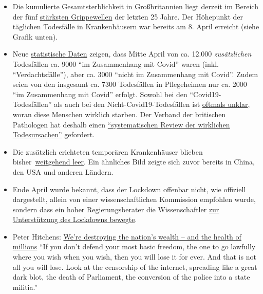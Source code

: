\begin{itemize}
\tightlist
\item
  Die kumulierte Gesamtsterblichkeit in Großbritannien liegt derzeit im
  Bereich der fünf \href{http://inproportion2.talkigy.com/}{stärksten
  Grippewellen} der letzten 25 Jahre. Der Höhepunkt der täglichen
  Todesfälle in Krankenhäusern war bereits am 8. April erreicht (siehe
  Grafik unten).
\item
  Neue
  \href{https://www.telegraph.co.uk/politics/2020/05/01/evidence-rising-britains-lockdown-could-deadly-mistake/}{statistische
  Daten} zeigen, dass Mitte April von ca. 12.000 \emph{zusätzlichen}
  Todesfällen ca. 9000 ``im Zusammenhang mit Covid'' waren (inkl.
  ``Verdachtsfälle''), aber ca. 3000 ``nicht im Zusammenhang mit
  Covid''. Zudem seien von den insgesamt ca. 7300 Todesfällen in
  Pflegeheimen nur ca. 2000 ``im Zusammenhang mit Covid'' erfolgt.
  Sowohl bei den ``Covid19-Todesfällen'' als auch bei den
  Nicht-Covid19-Todesfällen ist
  \href{https://www.hsj.co.uk/commissioning/thousands-of-extra-deaths-outside-hospital-not-attributed-to-covid-19/7027459.article}{oftmals
  unklar}, woran diese Menschen wirklich starben. Der Verband der
  britischen Pathologen hat deshalb einen
  \href{https://www.hsj.co.uk/coronavirus/systematic-reviews-to-discover-true-cause-of-outbreak-deaths/7027491.article}{``systematischen
  Review der wirklichen Todesursachen''} gefordert.
\item
  Die zusätzlich erichteten temporären Krankenhäuser blieben
  bisher~\href{https://www.telegraph.co.uk/news/0/do-many-nhs-nightingale-hospitals-remain-empty/}{weitgehend
  leer}. Ein ähnliches Bild zeigte sich zuvor bereits in China, den USA
  und anderen Ländern.
\item
  Ende April wurde bekannt, dass der Lockdown offenbar nicht, wie
  offiziell dargestellt, allein von einer wissenschaftlichen Kommission
  empfohlen wurde, sondern dass ein hoher Regierungs­berater die
  Wissenschaftler
  \href{https://www.bloomberg.com/news/articles/2020-04-28/top-aide-to-u-k-s-johnson-pushed-scientists-to-back-lockdown}{zur
  Unterstützung des Lockdowns bewegte}.
\item
  Peter Hitchens:
  \href{https://hitchensblog.mailonsunday.co.uk/2020/05/peter-hitchens-were-destroying-the-nations-wealth-and-the-health-of-millions.html}{We're
  destroying the nation's wealth -- and the health of millions} ``If you
  don't defend your most basic freedom, the one to go lawfully where you
  wish when you wish, then you will lose it for ever. And that is not
  all you will lose. Look at the censorship of the internet, spreading
  like a great dark blot, the death of Parliament, the conversion of the
  police into a state militia.''
\end{itemize}

